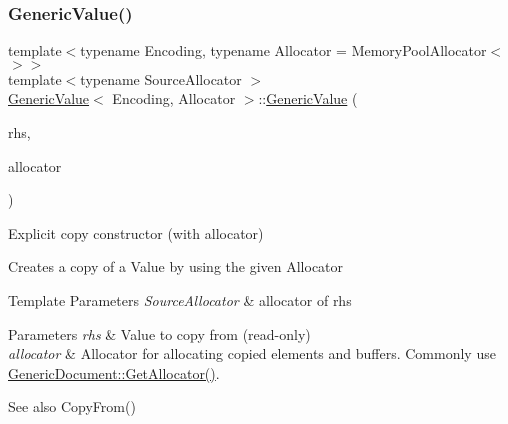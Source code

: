 \subsubsection{\texorpdfstring{Generic\+Value()}{GenericValue()}\hspace{0.1cm}{\footnotesize\ttfamily [2/5]}}
{\footnotesize\ttfamily template$<$typename Encoding, typename Allocator = Memory\+Pool\+Allocator$<$$>$$>$ \\
template$<$typename Source\+Allocator $>$ \\
\hyperlink{class_generic_value}{Generic\+Value}$<$ Encoding, Allocator $>$\+::\hyperlink{class_generic_value}{Generic\+Value} (\begin{DoxyParamCaption}\item[{const \hyperlink{class_generic_value}{Generic\+Value}$<$ Encoding, Source\+Allocator $>$ \&}]{rhs,  }\item[{Allocator \&}]{allocator }\end{DoxyParamCaption})\hspace{0.3cm}{\ttfamily [inline]}}



Explicit copy constructor (with allocator) 

Creates a copy of a Value by using the given Allocator 
\begin{DoxyTemplParams}{Template Parameters}
{\em Source\+Allocator} & allocator of {\ttfamily rhs} \\
\hline
\end{DoxyTemplParams}

\begin{DoxyParams}{Parameters}
{\em rhs} & Value to copy from (read-\/only) \\
\hline
{\em allocator} & Allocator for allocating copied elements and buffers. Commonly use \hyperlink{class_generic_document_aa4609d6b19f86aec1a6b96edf2c27686}{Generic\+Document\+::\+Get\+Allocator()}. \\
\hline
\end{DoxyParams}
\begin{DoxySeeAlso}{See also}
Copy\+From() 
\end{DoxySeeAlso}
\mbox{\label{class_generic_value_a0f6a0394bfffaedde88e433b2265194c}} 
